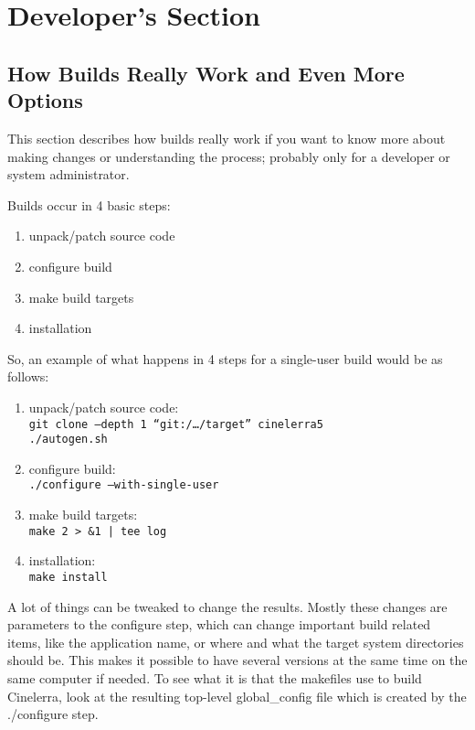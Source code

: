 \chapter{Developer's Section}%
\label{cha:developer's_section}

\section{How Builds Really Work and Even More Options}
\label{sec:builds_really_work_more_options}

This section describes how builds really work if you want to know more about making changes or understanding the process; probably only for a developer or system administrator.

Builds occur in 4 basic steps:

\begin{enumerate}[nosep]
	\item unpack/patch source code
	\item configure build
	\item make build targets
	\item installation
\end{enumerate}

So, an example of what happens in 4 steps for a single-user build would be as follows:

\begin{enumerate}[nosep]
	\item unpack/patch source code: \\
	\texttt{git clone --depth 1 ``git:/{\dots}/target'' cinelerra5} \\
	\texttt{./autogen.sh}
	\item configure build:\\
	\texttt{./configure --with-single-user}
	\item make build targets:\\
	\texttt{make 2 > \&1 | tee log}
	\item installation:\\
	\texttt{make install}
\end{enumerate}

A lot of things can be tweaked to change the results. Mostly these changes are parameters to the configure step, which can change important build related items, like the application name, or where and what the target system directories should be. This makes it possible to have several versions at the same time on the same computer if needed. To see what it is that the makefiles use to build Cinelerra, look at the resulting top-level global\_config file which is created by the ./configure step.

